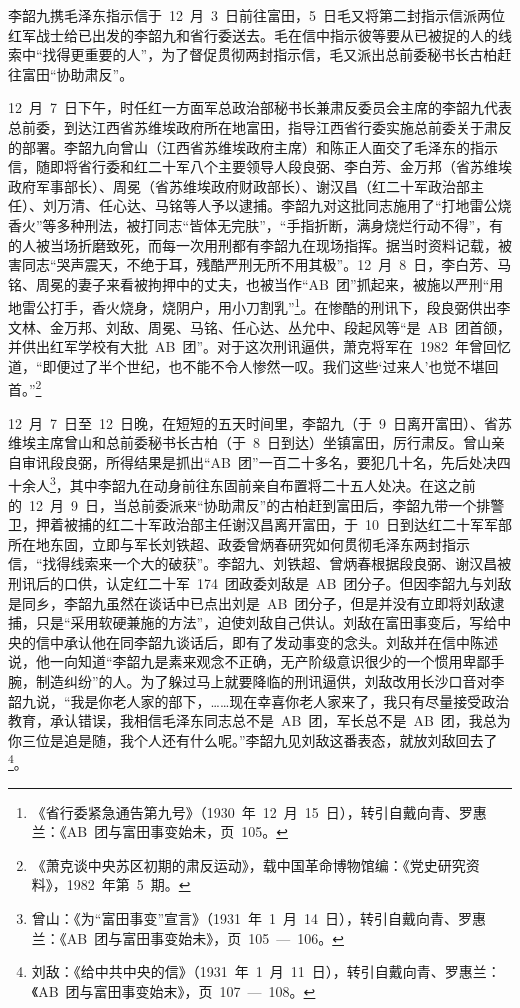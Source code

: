 李韶九携毛泽东指示信于~12~月~3~日前往富田，5~日毛又将第二封指示信派两位红军战士给已出发的李韶九和省行委送去。毛在信中指示彼等要从已被捉的人的线索中“找得更重要的人”，为了督促贯彻两封指示信，毛又派出总前委秘书长古柏赶往富田“协助肃反”。

12~月~7~日下午，时任红一方面军总政治部秘书长兼肃反委员会主席的李韶九代表总前委，到达江西省苏维埃政府所在地富田，指导江西省行委实施总前委关于肃反的部署。李韶九向曾山（江西省苏维埃政府主席）和陈正人面交了毛泽东的指示信，随即将省行委和红二十军八个主要领导人段良弼、李白芳、金万邦（省苏维埃政府军事部长）、周冕（省苏维埃政府财政部长）、谢汉昌（红二十军政治部主任）、刘万清、任心达、马铭等人予以逮捕。李韶九对这批同志施用了“打地雷公烧香火”等多种刑法，被打同志“皆体无完肤”，“手指折断，满身烧烂行动不得”，有的人被当场折磨致死，而每一次用刑都有李韶九在现场指挥。据当时资料记载，被害同志“哭声震天，不绝于耳，残酷严刑无所不用其极”。12~月~8~日，李白芳、马铭、周冕的妻子来看被拘押中的丈夫，也被当作“AB~团”抓起来，被施以严刑“用地雷公打手，香火烧身，烧阴户，用小刀割乳”\footnote{《省行委紧急通告第九号》（1930~年~12~月~15~日），转引自戴向青、罗惠兰：《AB~团与富田事变始未，页~105。}。在惨酷的刑讯下，段良弼供出李文林、金万邦、刘敌、周冕、马铭、任心达、丛允中、段起风等“是~AB~团首颌，并供出红军学校有大批~AB~团”。对于这次刑讯逼供，萧克将军在~1982~年曾回忆道，“即便过了半个世纪，也不能不令人惨然一叹。我们这些‘过来人’也觉不堪回首。”\footnote{《萧克谈中央苏区初期的肃反运动》，载中国革命博物馆编：《党史研究资料》，1982~年第~5~期。}

12~月~7~日至~12~日晚，在短短的五天时间里，李韶九（于~9~日离开富田）、省苏维埃主席曾山和总前委秘书长古柏（于~8~日到达）坐镇富田，厉行肃反。曾山亲自审讯段良弼，所得结果是抓出“AB~团”一百二十多名，要犯几十名，先后处决四十余人\footnote{曾山：《为“富田事变”宣言》（1931~年~1~月~14~日），转引自戴向青、罗惠兰：《AB~团与富田事变始未》，页~105~—~106。}，其中李韶九在动身前往东固前亲自布置将二十五人处决。在这之前的~12~月~9~日，当总前委派来“协助肃反”的古柏赶到富田后，李韶九带一个排警卫，押着被捕的红二十军政治部主任谢汉昌离开富田，于~10~日到达红二十军军部所在地东固，立即与军长刘铁超、政委曾炳春研究如何贯彻毛泽东两封指示信，“找得线索来一个大的破获”。李韶九、刘铁超、曾炳春根据段良弼、谢汉昌被刑讯后的口供，认定红二十军~174~团政委刘敌是~AB~团分子。但因李韶九与刘敌是同乡，李韶九虽然在谈话中已点出刘是~AB~团分子，但是并没有立即将刘敌逮捕，只是“采用软硬兼施的方法”，迫使刘敌自己供认。刘敌在富田事变后，写给中央的信中承认他在同李韶九谈话后，即有了发动事变的念头。刘敌并在信中陈述说，他一向知道“李韶九是素来观念不正确，无产阶级意识很少的一个惯用卑鄙手腕，制造纠纷”的人。为了躲过马上就要降临的刑讯逼供，刘敌改用长沙口音对李韶九说，“我是你老人家的部下，……现在幸喜你老人家来了，我只有尽量接受政治教育，承认错误，我相信毛泽东同志总不是~AB~团，军长总不是~AB~团，我总为你三位是追是随，我个人还有什么呢。”李韶九见刘敌这番表态，就放刘敌回去了\footnote{刘敌：《给中共中央的信》（1931~年~1~月~11~日），转引自戴向青、罗惠兰：《AB~团与富田事变始末》，页~107~—~108。}。

